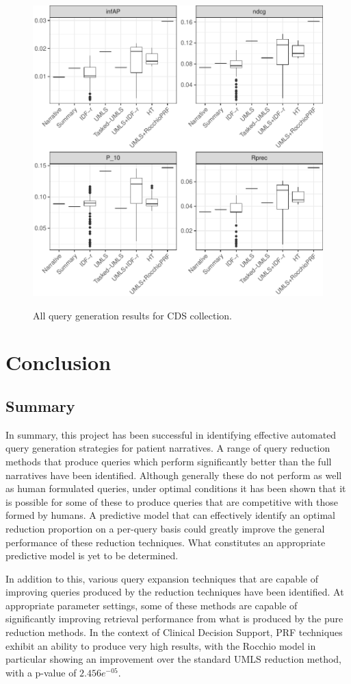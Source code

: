 \documentclass[a4paper]{report}
\begin{document}
\begin{figure}
\centering
\caption{All query generation results for CDS collection.}
\includegraphics[width=.9\columnwidth]{cds-generation.pdf}
\label{cds-total}
\end{figure}

\chapter{Conclusion}
\section{Summary}
In summary, this project has been successful in identifying effective automated query generation strategies for patient narratives. A range of query reduction methods that produce queries which perform significantly better than the full narratives have been identified. Although generally these do not perform as well as human formulated queries, under optimal conditions it has been shown that it is possible for some of these to produce queries that are competitive with those formed by humans. A predictive model that can effectively identify an optimal reduction proportion on a per-query basis could greatly improve the general performance of these reduction techniques. What constitutes an appropriate predictive model is yet to be determined.

In addition to this, various query expansion techniques that are capable of improving queries produced by the reduction techniques have been identified. At appropriate parameter settings, some of these methods are capable of significantly improving retrieval performance from what is produced by the pure reduction methods. In the context of Clinical Decision Support, PRF techniques exhibit an ability to produce very high results, with the Rocchio model in particular showing an improvement over the standard UMLS reduction method, with a p-value of $2.456e^{-05}$.
\end{document}

